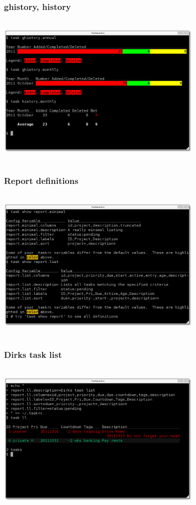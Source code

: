 \documentclass[t,handout]{beamer}
\begin{document}
\begin{frame}
\frametitle{ghistory, history}
\begin{center}
\includegraphics[width=10cm,height=7.5cm]{reports02.png}
\end{center}
\end{frame}

\begin{frame}
\frametitle{Report definitions}
\begin{center}
\includegraphics[width=10cm,height=7.5cm]{report_definitions.png}
\end{center}
\end{frame}

\begin{frame}
\frametitle{Dirks task list}
\begin{center}
\includegraphics[width=10cm,height=7.5cm]{report_dirks_list.png}
\end{center}
\end{frame}
\end{document}
